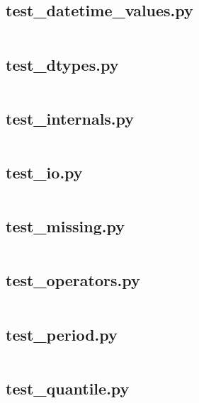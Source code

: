 \documentclass{article}
\begin{document}
\subsection{test\_datetime\_values.py}
\inputminted{python}{/home/dufferzafar/dev/@clones/pandas/pandas/tests/series/test_datetime_values.py}
\newpage

\subsection{test\_dtypes.py}
\inputminted{python}{/home/dufferzafar/dev/@clones/pandas/pandas/tests/series/test_dtypes.py}
\newpage

\subsection{test\_internals.py}
\inputminted{python}{/home/dufferzafar/dev/@clones/pandas/pandas/tests/series/test_internals.py}
\newpage

\subsection{test\_io.py}
\inputminted{python}{/home/dufferzafar/dev/@clones/pandas/pandas/tests/series/test_io.py}
\newpage

\subsection{test\_missing.py}
\inputminted{python}{/home/dufferzafar/dev/@clones/pandas/pandas/tests/series/test_missing.py}
\newpage

\subsection{test\_operators.py}
\inputminted{python}{/home/dufferzafar/dev/@clones/pandas/pandas/tests/series/test_operators.py}
\newpage

\subsection{test\_period.py}
\inputminted{python}{/home/dufferzafar/dev/@clones/pandas/pandas/tests/series/test_period.py}
\newpage

\subsection{test\_quantile.py}
\inputminted{python}{/home/dufferzafar/dev/@clones/pandas/pandas/tests/series/test_quantile.py}
\newpage
\end{document}
